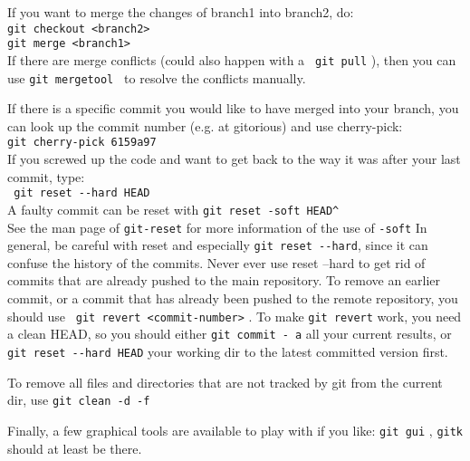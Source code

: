 \documentclass[a4paper,10pt] {article}
\begin{document}
If you want to merge the changes of branch1 into branch2, do:  \\
  \verb|git checkout <branch2>  | \\
  \verb|git merge <branch1> |\\
If there are merge conflicts (could also happen with a    \verb| git pull| ),   then you can use     \verb|git mergetool |   to resolve the conflicts manually.

If there is a specific commit you would like to have merged into your branch, you can look up the commit number (e.g. at gitorious) and use cherry-pick:  \\
  \verb|git cherry-pick 6159a97 |  \\
If you screwed up the code and want to get back to the way it was after your last commit, type:  \\
 \verb| git reset --hard HEAD|   \\
A faulty commit can be reset with     \verb|git reset -soft HEAD^|    \\
See the man page of   \verb|git-reset|  for more information of the use of   \verb|-soft| In general, be careful with reset and especially \verb|git reset --hard|, since it can confuse the history of the commits. Never ever use reset --hard to get rid of commits that are already pushed to the main repository. To remove an earlier commit, or a commit that has already been pushed to the remote repository, you should use     \verb| git revert <commit-number>|  .   To make   \verb|git revert|  work, you need a clean HEAD, so you should either   \verb|git commit - a|  all your current results, or   \verb|git reset --hard HEAD| your working dir to the latest committed version first.


To remove all files and directories that are not tracked by git from the current dir, use     \verb|git clean -d -f|   

Finally, a few graphical tools are available to play with if you like:    \verb|git gui| ,   \verb|gitk|  should at least be there.
\end{document}
